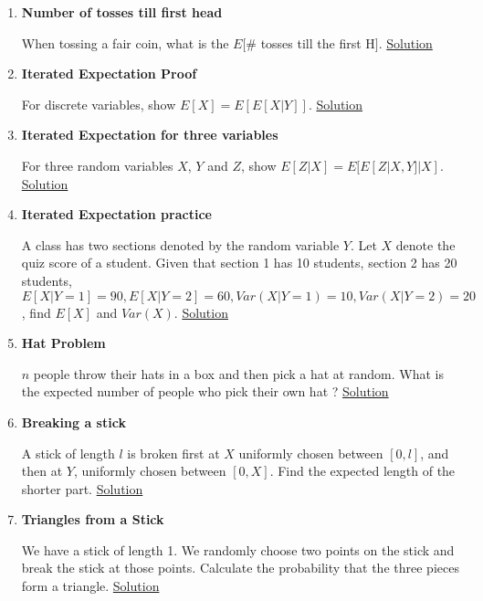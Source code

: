 \documentclass[../probability-notes.tex]{subfiles}
\begin{document}
\begin{enumerate}
    \item \hypertarget{q_tossh}{\textbf{Number of tosses till first head}}\newline
    When tossing a fair coin, what is the $E[$\# tosses till the first H$]$. \hyperlink{a_tossh}{Solution}
    
    \item \hypertarget{q_itrexpproof}{\textbf{Iterated Expectation Proof}}\newline
    For discrete variables, show $E[X] = E[E[X|Y]]$. \hyperlink{a_itrexpproof}{Solution}
    
    \item \hypertarget{q_itrexpthree}{\textbf{Iterated Expectation for three variables}}\newline
    For three random variables $X$, $Y$ and $Z$, show $E[Z|X] = E[E[Z|X,Y]|X]$. \hyperlink{a_itrexpthree}{Solution}
    
    \item \hypertarget{q_itrexppractice}{\textbf{Iterated Expectation practice}}\newline
    A class has two sections denoted by the random variable $Y$. Let $X$ denote the quiz score of a student. Given that section 1 has 10 students, section 2 has 20 students, $E[X|Y=1] = 90, E[X|Y=2] = 60, Var(X|Y=1) = 10, Var(X|Y=2) = 20$, find $E[X]$ and $Var(X)$. \hyperlink{a_itrexppractice}{Solution}

    \item \hypertarget{q_hatproblem}{\textbf{Hat Problem}}\newline
    $n$ people throw their hats in a box and then pick a hat at random. What is the expected number of people who pick their own hat ? \hyperlink{a_hatproblem}{Solution}
    
    \item \hypertarget{q_breakstick}{\textbf{Breaking a stick}}\newline
    A stick of length $l$ is broken first at $X$ uniformly chosen between $[0,l]$, and then at $Y$, uniformly chosen between $[0,X]$. Find the expected length of the shorter part. \hyperlink{a_breakstick}{Solution}

    
    \item \hypertarget{q_trianglestick}{\textbf{Triangles from a Stick}}\newline
    We have a stick of length 1. We randomly choose two points on the stick and break the stick at those points. Calculate the probability that the three pieces form a triangle. \hyperlink{a_trianglestick}{Solution}



\end{enumerate}
\end{document}
